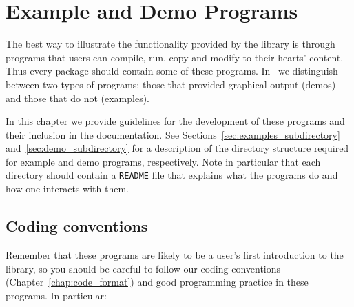 \chapter{Example and Demo Programs}
\label{chap:examples_and_demos}

The best way to illustrate the functionality provided by the library
is through programs that users can compile, run, copy and modify to
their hearts' content.  Thus every package should contain some of
these programs.  In \cgal\ we distinguish between two types of
programs:  those that provided graphical output (demos) and those that
do not (examples).

In this chapter we provide guidelines for the development
of these programs and their inclusion in the documentation.  See
Sections~\ref{sec:examples_subdirectory} and~\ref{sec:demo_subdirectory}
for a description of the directory structure required for example and
demo programs, respectively. Note in particular that each directory
should contain a \texttt{README} file that explains what the programs do and
how one interacts with them.

\section{Coding conventions}
\label{sec:ex_and_demo_coding}

Remember that these programs are likely to be a user's first introduction
to the library, so you should be careful to follow our coding conventions 
(Chapter~\ref{chap:code_format}) and good programming practice in these 
programs.  In particular:

